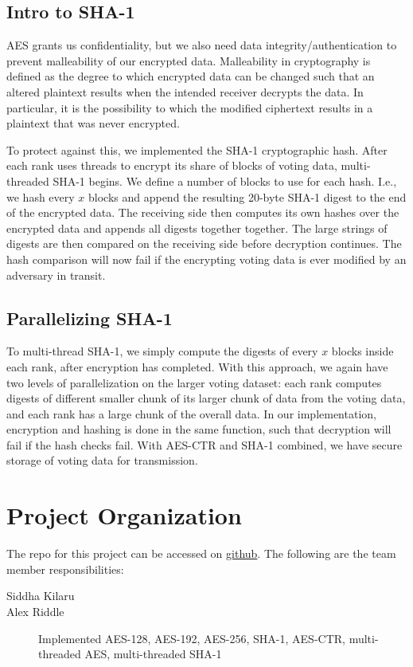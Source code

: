 \documentclass[final,5p,times,twocolumn,authoryear, 10pt]{elsarticle}
\newcommand\repo[1]{https://github.com/siddha20/CSCI4320-Project/tree/master/#1}
\begin{document}
\subsection{Intro to SHA-1}

AES grants us confidentiality, but we also need data integrity/authentication to prevent malleability of our encrypted data.
Malleability in cryptography is defined as the degree to which encrypted data can be changed such that an altered plaintext results
when the intended receiver decrypts the data. In particular, it is the possibility to which the modified ciphertext results in a plaintext
that was never encrypted.

To protect against this, we implemented the SHA-1 cryptographic hash. After each rank uses threads to encrypt its share of blocks of voting data,
multi-threaded SHA-1 begins. We define a number of blocks to use for each hash. I.e., we hash every $x$ blocks and append the resulting 20-byte SHA-1
digest to the end of the encrypted data. The receiving side then computes its own hashes over the encrypted data and appends all digests together
together. The large strings of digests are then compared on the receiving side before decryption continues. The hash comparison will now fail if
the encrypting voting data is ever modified by an adversary in transit. 

\subsection{Parallelizing SHA-1}

To multi-thread SHA-1, we simply compute the digests of every $x$ blocks inside each rank, after encryption has completed. With this approach, we again
have two levels of parallelization on the larger voting dataset: each rank computes digests of different smaller chunk of its larger chunk of data from the
voting data, and each rank has a large chunk of the overall data. In our implementation, encryption and hashing is done in the same function, such that
decryption will fail if the hash checks fail. With AES-CTR and SHA-1 combined, we have secure storage of voting data for transmission.

\section{Project Organization}
\label{Project Organization}

The repo for this project can be accessed on \href{\repo}{github}.
The following are the team member responsibilities:
\begin{description}
    \item[Siddha Kilaru] 
    \item[Alex Riddle] Implemented AES-128, AES-192, AES-256, SHA-1, AES-CTR, multi-threaded AES, multi-threaded SHA-1
\end{description}
\end{document}

